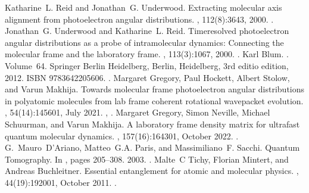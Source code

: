 \documentclass[letterpaper,table,10pt,english]{jupyterBook}
\begin{document}
\begin{sphinxthebibliography}{10}
\sphinxAtStartPar
Katharine L. Reid and Jonathan G. Underwood. Extracting molecular axis alignment from photoelectron angular distributions. , 112(8):3643, 2000. .
\sphinxAtStartPar
Jonathan G. Underwood and Katharine L. Reid. Time\sphinxhyphen{}resolved photoelectron angular distributions as a probe of intramolecular dynamics: Connecting the molecular frame and the laboratory frame. , 113(3):1067, 2000. .
\sphinxAtStartPar
Karl Blum. . Volume 64. Springer Berlin Heidelberg, Berlin, Heidelberg, 3rd editio edition, 2012. ISBN 978\sphinxhyphen{}3\sphinxhyphen{}642\sphinxhyphen{}20560\sphinxhyphen{}6. .
\sphinxAtStartPar
Margaret Gregory, Paul Hockett, Albert Stolow, and Varun Makhija. Towards molecular frame photoelectron angular distributions in polyatomic molecules from lab frame coherent rotational wavepacket evolution. , 54(14):145601, July 2021. , .
\sphinxAtStartPar
Margaret Gregory, Simon Neville, Michael Schuurman, and Varun Makhija. A laboratory frame density matrix for ultrafast quantum molecular dynamics. , 157(16):164301, October 2022. .
\sphinxAtStartPar
G. Mauro D'Ariano, Matteo G.A. Paris, and Massimiliano F. Sacchi. Quantum Tomography. In , pages 205–308. 2003. .
\sphinxAtStartPar
Malte C Tichy, Florian Mintert, and Andreas Buchleitner. Essential entanglement for atomic and molecular physics. , 44(19):192001, October 2011. .

\end{sphinxthebibliography}
\end{document}
